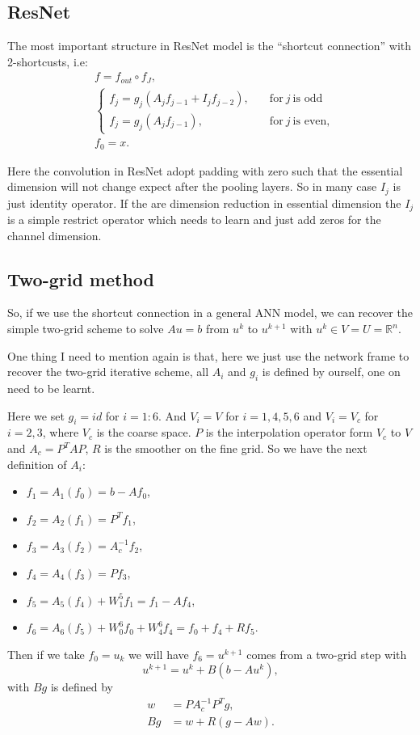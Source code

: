 \subsection{ResNet}
The most important structure in ResNet model is the ``shortcut connection'' with 2-shortcusts, i.e:
\begin{align}
&f = f_{out}\circ f_J, \\
&\begin{cases}
f_j = g_j(A_jf_{j-1} + I_jf_{j-2}), \quad &\text{for} ~j~ \text{is odd} \\
f_j = g_j(A_jf_{j-1}), \quad  &\text{for} ~j~ \text{is even},
\end{cases} \\
&f_0 = x.
\end{align}

Here the convolution in ResNet adopt padding with zero such that the essential dimension will not change expect after the pooling layers. So in many case $I_j$ is just identity operator. If the are dimension reduction in essential dimension the $I_j$ is a simple restrict operator which needs to learn and just add zeros for the channel dimension. 

\subsection{Two-grid method}
So, if we use the shortcut connection in a general ANN model, we can recover the simple two-grid scheme to solve $Au = b$ from $u^k$ to $u^{k+1}$ with $u^k \in V = U = \mathbb{R}^n$.

One thing I need to mention again is that, here we just use the network frame to recover the two-grid iterative scheme, all $A_i$ and $g_i$ is defined by ourself, one on need to be learnt. 

Here we set $g_i = id$ for $i = 1:6$.  And $V_i = V$ for $i = 1,4,5,6$ and $V_i = V_c$ for $i = 2,3$, where $V_c$ is the coarse space. $P$ is the interpolation operator form $V_c$ to $V$ and $A_c = P^T A P$, $R$ is the smoother on the fine grid. So we have the next definition of $A_i$: 
\begin{itemize}
\item $f_1 = A_1(f_0) = b - Af_0$,
\item $f_2 = A_2(f_1) = P^T f_1$,
\item $f_3 = A_3(f_2) = A^{-1}_c f_2$,
\item $f_4 = A_4(f_3) = P f_3$,
\item $f_5 = A_5(f_4) + W_1^5 f_1 =f_1 -  Af_4$,
\item $f_6 = A_6(f_5) + W_0^6 f_0 + W_4^6 f_4 = f_0 + f_4 + Rf_5$.
\end{itemize}
Then if we take $f_0 = u_k$ we will have $f_6 = u^{k+1}$ comes from a two-grid step with 
\begin{equation}
u^{k+1} = u^{k} + B(b - A u^k),
\end{equation}
with $Bg$ is defined by
\begin{align}
w &= PA_c^{-1}P^{T}g, \\
Bg &= w + R(g - Aw). 
\end{align}

